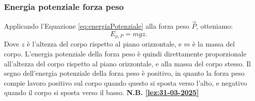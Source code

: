     \subsubsection{Energia potenziale forza peso}
        Applicando l'Equazione \ref{eq:energiaPotenziale} alla forza peso $\vec{P}$, otteniamo:
        \begin{equation}
            E_{\rho, P} = mgz.
        \end{equation}
        Dove $z$ è l'altezza del corpo rispetto al piano orizzontale, e $m$ è la massa del corpo. L'energia potenziale della forza peso è quindi direttamente proporzionale all'altezza del corpo rispetto al piano orizzontale, e alla massa del corpo stesso. Il segno dell'energia potenziale della forza peso è positivo, in quanto la forza peso compie lavoro positivo sul corpo quando questo si sposta verso l'alto, e negativo quando il corpo si sposta verso il basso.\newline
        \textbf{N.B. \ref{lez:31-03-2025}}
